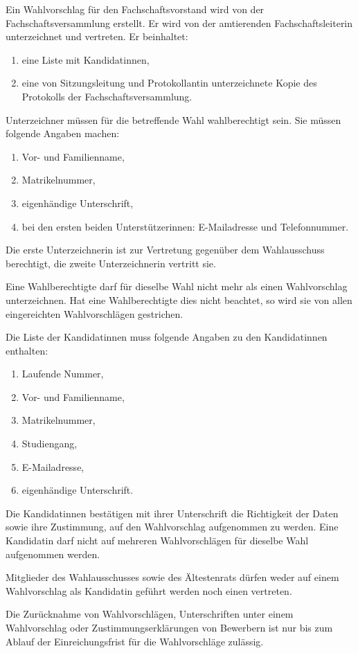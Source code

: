 Ein Wahlvorschlag für den Fachschaftsvorstand wird von der Fachschaftsversammlung erstellt. Er wird von der amtierenden Fachschaftsleiterin unterzeichnet und vertreten. Er beinhaltet:
\begin{enumerate}
    \item eine Liste mit Kandidatinnen,
    \item eine von Sitzungsleitung und Protokollantin unterzeichnete Kopie des Protokolls der Fachschaftsversammlung.
\end{enumerate}

Unterzeichner müssen für die betreffende Wahl wahlberechtigt sein. Sie müssen folgende Angaben machen:
\begin{enumerate}
\item Vor- und Familienname,
\item Matrikelnummer,
\item eigenhändige Unterschrift,
\item bei den ersten beiden Unterstützerinnen: E-Mailadresse und Telefonnummer.
\end{enumerate}
Die erste Unterzeichnerin ist zur Vertretung gegenüber dem Wahlausschuss berechtigt, die zweite Unterzeichnerin vertritt sie.

Eine Wahlberechtigte darf für dieselbe Wahl nicht mehr als einen Wahlvorschlag unterzeichnen. Hat eine Wahlberechtigte dies nicht beachtet, so wird sie von allen eingereichten Wahlvorschlägen gestrichen.

Die Liste der Kandidatinnen muss folgende Angaben zu den Kandidatinnen enthalten:
\begin{enumerate}
\item Laufende Nummer,
\item Vor- und Familienname,
\item Matrikelnummer,
\item Studiengang,
\item E-Mailadresse,
\item eigenhändige Unterschrift.
\end{enumerate}
Die Kandidatinnen bestätigen mit ihrer Unterschrift die Richtigkeit der Daten sowie ihre Zustimmung, auf den Wahlvorschlag aufgenommen zu werden. Eine Kandidatin darf nicht auf mehreren Wahlvorschlägen für dieselbe Wahl aufgenommen werden.

Mitglieder des Wahlausschusses sowie des Ältestenrats dürfen weder auf einem Wahlvorschlag als Kandidatin geführt werden noch einen vertreten.

Die Zurücknahme von Wahlvorschlägen, Unterschriften unter einem Wahlvorschlag oder Zustimmungserklärungen von Bewerbern ist nur bis zum Ablauf der Einreichungsfrist für die Wahlvorschläge zulässig.

